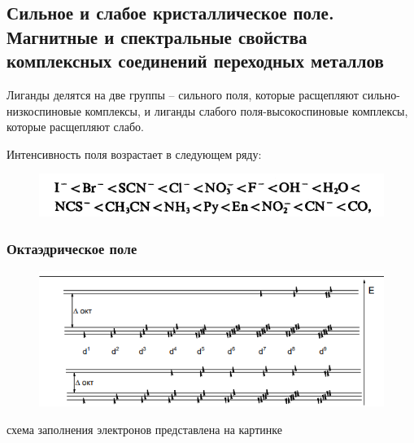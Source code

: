\subsection{Сильное и слабое кристаллическое поле. Магнитные и спектральные свойства комплексных соединений переходных металлов}

 Лиганды делятся на две группы – сильного поля, которые расщепляют сильно-низкоспиновые комплексы, и лиганды слабого поля-высокоспиновые комплексы, которые расщепляют слабо. 
 
Интенсивность поля возрастает в следующем ряду:
 
\begin{figure}[H]
\centering
\includegraphics[scale=.600]{images/spectrochem_row.png}
\end{figure}
 
 \subsubsection*{Октаэдрическое поле}
 
 \begin{figure}[htp]
\centering
\includegraphics[scale=1.00]{images/electrones.png}
\end{figure} схема заполнения электронов представлена на картинке

